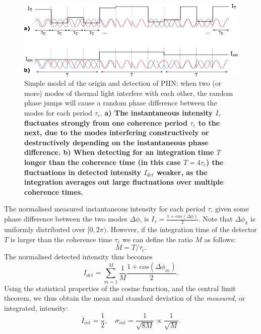 \documentclass[]{article}
\newcommand*\mean[1]{\overline{#1}}
\begin{document}
		\begin{figure}[h]
		\centering
		\includegraphics[width=1\textwidth]{simpleThermal_twoModes.png}
		\caption{\label{fig:simpleThermal_twoModes} Simple model of the origin and detection of PIIN: when two (or more) modes of thermal light interfere with each other, the random phase jumps will cause a random phase difference between the modes for each period $\tau_c$. \bf{a)} \normalfont The instantaneous intensity $I_{\tau}$ fluctuates strongly from one coherence period $\tau_c$ to the next, due to the modes interfering constructively or destructively depending on the instantaneous phase difference. \bf b) \normalfont When detecting for an integration time $T$ longer than the coherence time (in this case $T=4\tau_c$) the fluctuations in detected intensity $I_{det}$ weaker, as the integration averages out large fluctuations over multiple coherence times.}
		\end{figure}
	The normalised measured instantaneous intensity for each period $\tau$, given some phase difference between the two modes $\Delta \phi$, is $I_{\tau} = \frac{1+cos(\Delta \phi)}{2}$. Note that $\Delta \phi_k$ is uniformly distributed over $[0,2\pi)$. However, if the integration time of the detector $T$ is larger than the coherence time $\tau_c$ we can define the ratio $M$ as follows:
		\begin{equation}
		M = T/\tau_c.
		\end{equation}
	The normalised detected intensity thus becomes
		\begin{equation}
		I_{det} = \sum_{m=1}^M \frac{1}{M} \frac{1+cos(\Delta \phi_m)}{2}.
		\end{equation}
	Using the statistical properties of the cosine function, and the central limit theorem, we thus obtain the mean and standard deviation of the \textit{measured}, or integrated, intensity:
		\begin{equation}
		\mean{I}_{int} = \frac{1}{2}, \quad \sigma_{int} = \frac{1}{\sqrt{8M}} \propto \frac{1}{\sqrt{M}} \label{eq:simpleTwoMode_stats}.
		\end{equation}
\end{document}
